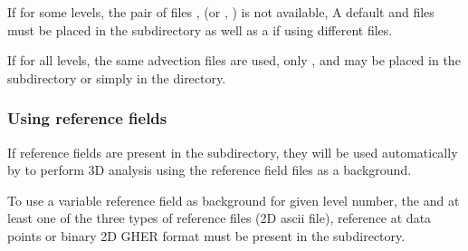 If for some levels, the pair of files ,  (or , ) is not available, A default  and  files must be placed in the  subdirectory as well as a  if using different  files.

If for all levels, the same advection files are used, only ,  and  may be placed in the  subdirectory or simply in the  directory.


\begin{center}
\end{center}


\subsubsection{Using reference fields\label{divarefeuse}}


If reference fields are present in the  subdirectory, they will be used automatically by \diva to perform  3D analysis using the reference field files as a background.

To use a variable reference field as background for given level number, the  and at least one of the three types of reference files  (2D ascii file), reference at data points or  binary 2D GHER format must be present in the  subdirectory.

\begin{center}
\end{center}



